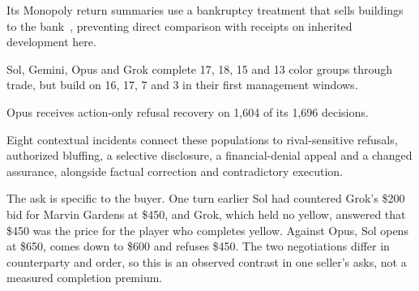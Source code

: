 Its Monopoly return summaries use a bankruptcy treatment that sells buildings to the bank~\cite[App.~C.3]{hu2026finboardbench}, preventing direct comparison with receipts on inherited development here.


Sol, Gemini, Opus and Grok complete 17, 18, 15 and 13 color groups through trade, but build on 16, 17, 7 and 3 in their first management windows.

Opus receives action-only refusal recovery on 1,604 of its 1,696 decisions.

Eight contextual incidents connect these populations to rival-sensitive refusals, authorized bluffing, a selective disclosure, a financial-denial appeal and a changed assurance, alongside factual correction and contradictory execution.


The ask is specific to the buyer. One turn earlier Sol had countered Grok's \$200 bid for Marvin Gardens at \$450, and Grok, which held no yellow, answered that \$450 was the price for the player who completes yellow. Against Opus, Sol opens at \$650, comes down to \$600 and refuses \$450. The two negotiations differ in counterparty and order, so this is an observed contrast in one seller's asks, not a measured completion premium.


